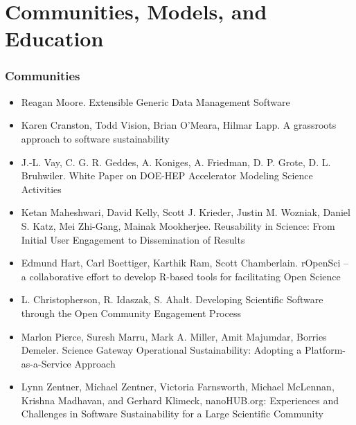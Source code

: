 \documentclass[11pt, oneside]{amsart}
\begin{document}
\section*{Communities, Models, and Education}

\subsubsection*{Communities}

\begin{itemize}

\item Reagan Moore. Extensible Generic Data Management Software~\cite{Moore_WSSSPE}

\item Karen Cranston, Todd Vision, Brian O'Meara, Hilmar Lapp. A
  grassroots approach to software sustainability~\cite{Cranston_WSSSPE}

\item J.-L. Vay, C. G. R. Geddes, A. Koniges, A. Friedman,
  D. P. Grote, D. L. Bruhwiler. White Paper on DOE-HEP Accelerator
  Modeling Science Activities~\cite{Vay_WSSSPE}

\item Ketan Maheshwari, David Kelly, Scott J. Krieder, Justin M. Wozniak, Daniel S. Katz, Mei Zhi-Gang, Mainak Mookherjee. Reusability in Science: From Initial User Engagement to Dissemination of Results~\cite{Maheshwari_WSSSPE}

\item Edmund Hart, Carl Boettiger, Karthik Ram, Scott Chamberlain. rOpenSci -- a collaborative effort to develop R-based tools for facilitating Open Science~\cite{Hart_WSSSPE}

\item L. Christopherson, R. Idaszak, S. Ahalt. Developing Scientific Software through the Open Community Engagement Process~\cite{Christopherson_WSSSPE}

\item Marlon Pierce, Suresh Marru, Mark A. Miller, Amit Majumdar, Borries Demeler. Science Gateway Operational Sustainability: Adopting a Platform-as-a-Service Approach~\cite{Pierce2_WSSSPE}

\item Lynn Zentner, Michael Zentner, Victoria Farnsworth, Michael
  McLennan, Krishna Madhavan, and Gerhard Klimeck, nanoHUB.org:
  Experiences and Challenges in Software Sustainability for a Large
  Scientific Community~\cite{Zentner_WSSSPE}


\end{itemize}
\end{document}
